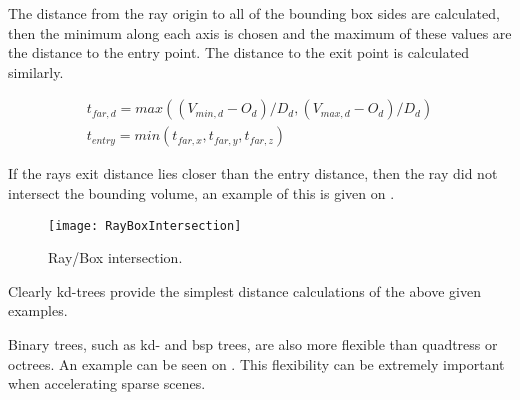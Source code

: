 The distance from the ray origin to all of the bounding box sides are
calculated, then the minimum along each axis is chosen and the maximum
of these values are the distance to the entry point. The distance to
the exit point is calculated similarly.

\begin{displaymath}
  \begin{array}{l}
    t_{far,d} = max((V_{min,d} - O_d) / D_d, (V_{max,d} - O_d) / D_d)\\
    t_{entry} = min(t_{far,x}, t_{far,y}, t_{far,z})
  \end{array}
\end{displaymath}


If the rays exit distance lies closer than the entry distance, then
the ray did not intersect the bounding volume, an example of this is
given on .

\begin{figure}
  \centering
  \texttt{[image: RayBoxIntersection]}
  \caption{Ray/Box intersection.}
  \label{fig:rayBoxIntersection}
\end{figure}

Clearly kd-trees provide the simplest distance calculations of the
above given examples.


Binary trees, such as kd- and bsp trees, are also more flexible than
quadtress or octrees. An example can be seen on
. This flexibility can be extremely important
when accelerating sparse scenes.

